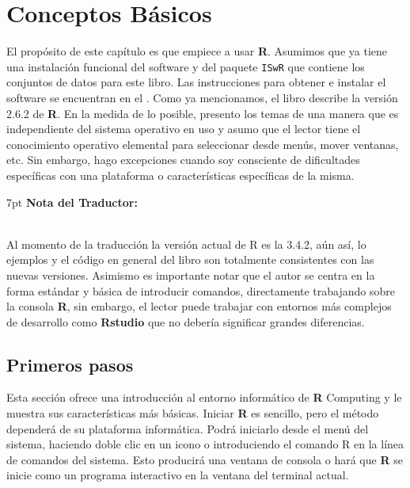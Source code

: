 \documentclass[spanish]{extbook}
\newenvironment{tradnote}{%
  \def\FrameCommand{%
    \hspace{1pt}%
    {\color{darkblue}\vrule width 2pt}%
    {\color{formalshade}\vrule width 4pt}%
    \colorbox{formalshade}%
  }%
  \vspace{12pt}
  \MakeFramed{\advance\hsize-\width\FrameRestore}%
  \noindent\hspace{-4.55pt}%
  \begin{adjustwidth}{}{7pt}%
  \vspace{1pt}%
  \textbf{Nota del Traductor:\\\\}%
}
{%
  \vspace{6pt}\end{adjustwidth}\endMakeFramed%
}
\numberwithin{equation}{section}
\numberwithin{figure}{section}
\begin{document}
\chapter{Conceptos Básicos}

El propósito de este capítulo es que empiece a usar  \textbf{R}.  Asumimos que
ya tiene una instalación funcional del software y del paquete \texttt{ISwR} que
contiene los conjuntos de datos para este libro. Las instrucciones para obtener
e instalar el software se encuentran en el . Como ya
mencionamos, el libro describe la versión 2.6.2 de  \textbf{R}.  En la medida
de lo posible, presento los temas de una manera que es independiente del
sistema operativo en uso y asumo que el lector tiene el conocimiento operativo
elemental para seleccionar desde menús, mover ventanas, etc. Sin embargo, hago
excepciones cuando soy consciente de dificultades específicas con una
plataforma o características específicas de la misma.

\begin{tradnote} 
	Al momento de la traducción la versión actual de R es la
	3.4.2, aún así, lo ejemplos y el código en general del libro son totalmente
	consistentes con las nuevas versiones. Asimismo es importante notar que el
	autor se centra en la forma estándar y básica de introducir comandos,
	directamente trabajando sobre la consola \textbf{R}, sin embargo, el lector
	puede trabajar con entornos más complejos de desarrollo como
	\textbf{Rstudio} que no debería significar grandes diferencias.
\end{tradnote} \newpage

\section{Primeros pasos}

Esta sección ofrece una introducción al entorno informático de  \textbf{R}
Computing y le muestra sus características más básicas. Iniciar  \textbf{R} es
sencillo, pero el método dependerá de su plataforma informática.  Podrá
iniciarlo desde el menú del sistema, haciendo doble clic en un icono o
introduciendo el comando \textquotedbl{}R\textquotedbl{} en la línea de
comandos del sistema. Esto producirá una ventana de consola o hará que
\textbf{R} se inicie como un programa interactivo en la ventana del terminal
actual. 
\end{document}

